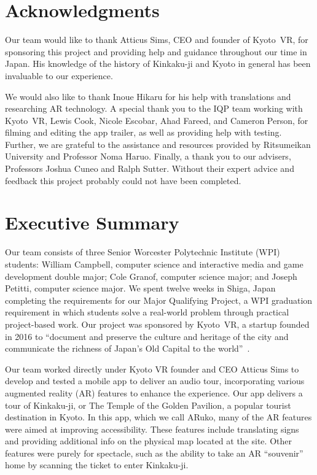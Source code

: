 \documentclass[a4paper, 10pt, american, titlepage]{article}
\begin{document}
\begin{abstract}
\end{abstract}

\section*{Acknowledgments}
\label{sec:acknowledgements}

Our team would like to thank Atticus Sims, CEO and founder of Kyoto~VR, for
sponsoring this project and providing help and guidance throughout our time in
Japan. His knowledge of the history of Kinkaku-ji and Kyoto in general has been
invaluable to our experience.

We would also like to thank Inoue Hikaru for his help with translations and
researching AR technology. A special thank you to the IQP team working with
Kyoto~VR, Lewis Cook, Nicole Escobar, Ahad Fareed, and Cameron Person, for
filming and editing the app trailer, as well as providing help with testing.
Further, we are grateful to the assistance and resources provided by Ritsumeikan
University and Professor Noma Haruo. Finally, a thank you to our advisers,
Professors Joshua Cuneo and Ralph Sutter. Without their expert advice and
feedback this project probably could not have been completed.

\clearpage

\section*{Executive Summary}
\label{sec:executiveSummary}

Our team consists of three Senior Worcester Polytechnic Institute (WPI)
students: William Campbell, computer science and interactive media and game
development double major; Cole Granof, computer science major; and Joseph
Petitti, computer science major. We spent twelve weeks in Shiga, Japan
completing the requirements for our Major Qualifying Project, a WPI graduation
requirement in which students solve a real-world problem through practical
project-based work. Our project was sponsored by Kyoto~VR, a startup founded in
2016 to ``document and preserve the culture and heritage of the city and
communicate the richness of Japan’s Old Capital to the
world''~\autocite{kyotovr2018}.

Our team worked directly under Kyoto VR founder and CEO Atticus Sims to develop
and tested a mobile app to deliver an audio tour, incorporating various
augmented reality (AR) features to enhance the experience. Our app delivers a
tour of Kinkaku-ji, or The Temple of the Golden Pavilion, a popular tourist
destination in Kyoto. In this app, which we call ARuko, many of the AR features
were aimed at improving accessibility. These features include translating signs
and providing additional info on the physical map located at the site. Other
features were purely for spectacle, such as the ability to take an AR
``souvenir'' home by scanning the ticket to enter Kinkaku-ji.
\end{document}
